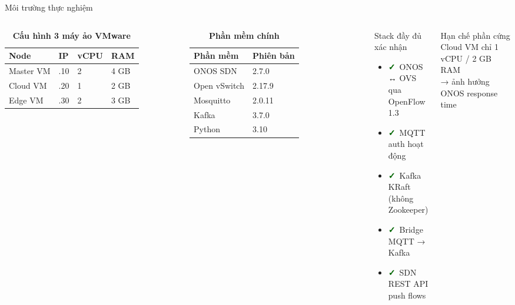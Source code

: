 \documentclass[aspectratio=169, 12pt]{beamer}
\newcommand{\cmark}{\textcolor{darkgreen}{\textbf{✓}}}
\begin{document}
\begin{frame}{Môi trường thực nghiệm}

\begin{columns}[T]
\begin{table}
\caption*{\textbf{Cấu hình 3 máy ảo VMware}}
\begin{tabular}{llll}
\toprule
\textbf{Node} & \textbf{IP} & \textbf{vCPU} & \textbf{RAM} \\
\midrule
Master VM & .10 & 2 & 4 GB \\
Cloud VM  & .20 & 1 & 2 GB \\
Edge VM   & .30 & 2 & 3 GB \\
\bottomrule
\end{tabular}
\end{table}

\vspace{0.3cm}
\begin{table}
\caption*{\textbf{Phần mềm chính}}
\begin{tabular}{ll}
\toprule
\textbf{Phần mềm} & \textbf{Phiên bản} \\
\midrule
ONOS SDN   & 2.7.0   \\
Open vSwitch & 2.17.9 \\
Mosquitto  & 2.0.11  \\
Kafka      & 3.7.0   \\
Python     & 3.10    \\
\bottomrule
\end{tabular}
\end{table}

\begin{exampleblock}{Stack đầy đủ xác nhận}
\begin{itemize}
  \item \cmark\ ONOS ↔ OVS qua OpenFlow 1.3
  \item \cmark\ MQTT auth hoạt động
  \item \cmark\ Kafka KRaft (không Zookeeper)
  \item \cmark\ Bridge MQTT → Kafka
  \item \cmark\ SDN REST API push flows
\end{itemize}
\end{exampleblock}

\begin{alertblock}{Hạn chế phần cứng}
Cloud VM chỉ 1 vCPU / 2 GB RAM\\→ ảnh hưởng ONOS response time
\end{alertblock}
\end{columns}

\end{frame}
\end{document}
